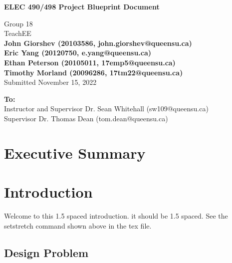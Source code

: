 \documentclass[letterpaper,12pt]{article}
\begin{document}
\begin{titlepage}
    \begin{center}
        \vspace*{1cm}

        \Large
        \textbf{ELEC 490/498 Project Blueprint Document}

        \vspace{0.5cm}
        Group 18\\
        TeachEE\\
        \vspace{0.5cm}
        \normalsize
        \textbf{John Giorshev (20103586, john.giorshev@queensu.ca) \\ Eric Yang (20120750, e.yang@queensu.ca) \\ Ethan Peterson (20105011, 17emp5@queensu.ca) \\ Timothy Morland (20096286, 17tm22@queensu.ca)}\\
        \vspace{0.5cm}
        Submitted November 15, 2022\\

        \vfill
            
        \textbf{To:}\\
        Instructor and Supervisor Dr. Sean Whitehall (sw109@queensu.ca) \\
        Supervisor Dr. Thomas Dean (tom.dean@queensu.ca) \\
            
        \vspace{1.8cm}

    \end{center}
\end{titlepage}
\section*{Executive Summary}

\newpage

\tableofcontents
\listoffigures
\listoftables
\newpage
{}
\section{Introduction} \label{sec:intro} %
Welcome to this 1.5 spaced introduction. it should be 1.5 spaced. See the setstretch command shown above in the tex file.
\subsection{Design Problem} %
\end{document}
